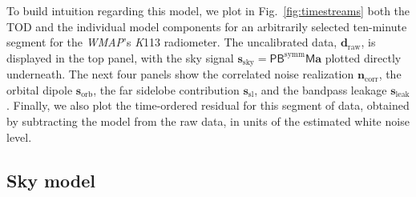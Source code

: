 \documentclass[twocolumn]{../../common/aa}
\def\WMAP{\emph{WMAP}}
\newcommand{\K}[0]{\textit K}
\begin{document}
To build intuition regarding this model, we plot in Fig.~\ref{fig:timestreams} both the TOD and the individual model components for an arbitrarily selected ten-minute segment for the \WMAP's \K113 radiometer. The uncalibrated data, $\boldsymbol d_\mathrm{raw}$, is displayed in the top panel, with the sky signal $\boldsymbol s_\mathrm{sky}=\mathsf P\mathsf B^\mathrm{symm}\mathsf M\boldsymbol a$ plotted directly underneath. The next four panels show the correlated noise realization $\boldsymbol n_\mathrm{corr}$, the orbital dipole $\boldsymbol s_\mathrm{orb}$, the far sidelobe contribution $\boldsymbol s_\mathrm{sl}$, and the bandpass leakage $\boldsymbol s_\mathrm{leak}$. Finally, we also plot the time-ordered residual for this segment of data, obtained by subtracting the model from the raw data, in units of the estimated white noise level. 


\subsection{Sky model}\label{subsec:sky_model}
\end{document}
